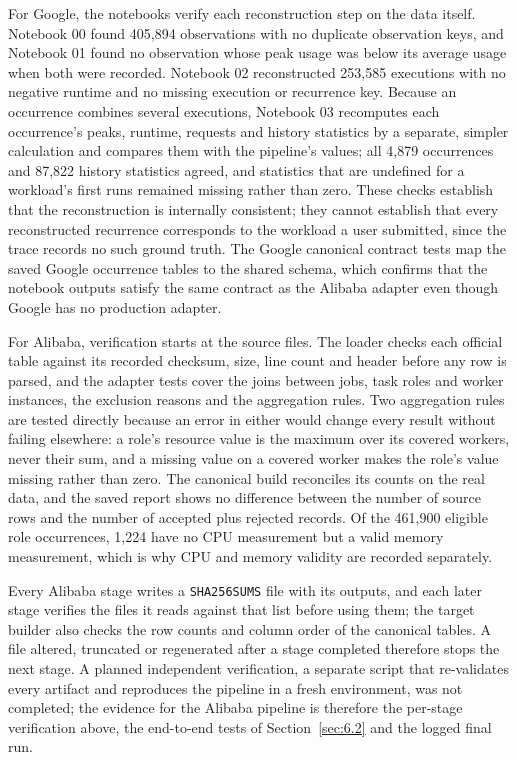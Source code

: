 \documentclass{IEEEtran}
\begin{document}
For Google, the notebooks verify each reconstruction step on the data itself. Notebook 00 found 405,894 observations with no duplicate observation keys, and Notebook 01 found no observation whose peak usage was below its average usage when both were recorded. Notebook 02 reconstructed 253,585 executions with no negative runtime and no missing execution or recurrence key. Because an occurrence combines several executions, Notebook 03 recomputes each occurrence's peaks, runtime, requests and history statistics by a separate, simpler calculation and compares them with the pipeline's values; all 4,879 occurrences and 87,822 history statistics agreed, and statistics that are undefined for a workload's first runs remained missing rather than zero. These checks establish that the reconstruction is internally consistent; they cannot establish that every reconstructed recurrence corresponds to the workload a user submitted, since the trace records no such ground truth. The Google canonical contract tests map the saved Google occurrence tables to the shared schema, which confirms that the notebook outputs satisfy the same contract as the Alibaba adapter even though Google has no production adapter.

For Alibaba, verification starts at the source files. The loader checks each official table against its recorded checksum, size, line count and header before any row is parsed, and the adapter tests cover the joins between jobs, task roles and worker instances, the exclusion reasons and the aggregation rules. Two aggregation rules are tested directly because an error in either would change every result without failing elsewhere: a role's resource value is the maximum over its covered workers, never their sum, and a missing value on a covered worker makes the role's value missing rather than zero. The canonical build reconciles its counts on the real data, and the saved report shows no difference between the number of source rows and the number of accepted plus rejected records. Of the 461,900 eligible role occurrences, 1,224 have no CPU measurement but a valid memory measurement, which is why CPU and memory validity are recorded separately.

Every Alibaba stage writes a \texttt{SHA256SUMS} file with its outputs, and each later stage verifies the files it reads against that list before using them; the target builder also checks the row counts and column order of the canonical tables. A file altered, truncated or regenerated after a stage completed therefore stops the next stage. A planned independent verification, a separate script that re-validates every artifact and reproduces the pipeline in a fresh environment, was not completed; the evidence for the Alibaba pipeline is therefore the per-stage verification above, the end-to-end tests of Section~\ref{sec:6.2} and the logged final run.
\end{document}
